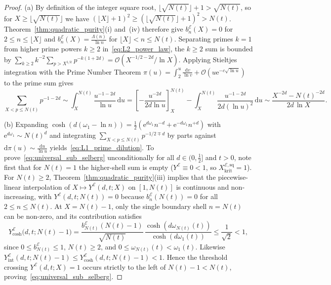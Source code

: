 \documentclass[11pt,reqno]{amsart}
\theoremstyle{definition}
\theoremstyle{remark}
\numberwithin{equation}{section}
\newcommand{\dd}{\mathrm{d}}
\newcommand{\ee}{\mathrm{e}}
\begin{document}
\begin{proof}
(a) By definition of the integer square root, $\lfloor\sqrt{N(t)}\rfloor + 1 > \sqrt{N(t)}$, so for $X \ge \lfloor\sqrt{N(t)}\rfloor$ we have $(\lfloor X\rfloor + 1)^2 \ge (\lfloor\sqrt{N(t)}\rfloor + 1)^2 > N(t)$. Theorem~\ref{thm:quadratic_purity}(i) and~(iv) therefore give $b_n^{\mathcal{E}}(X) = 0$ for $2 \le n \le \lfloor X\rfloor$ and $b_n^{\mathcal{E}}(X) = \frac{\Lambda(n)}{\ln n}$ for $\lfloor X\rfloor < n \le N(t)$. Separating primes $k = 1$ from higher prime powers $k \ge 2$ in~\eqref{eq:L2_power_law}, the $k \ge 2$ sum is bounded by $\sum_{k \ge 2} k^{-2}\sum_{p > X^{1/k}} p^{-k(1+2d)} = \mathcal{O}(X^{-1/2-2d}/\ln X)$. Applying Stieltjes integration with the Prime Number Theorem $\pi(u) = \int_2^u \frac{\dd v}{\ln v} + \mathcal{O}(u\ee^{-c\sqrt{\ln u}})$ to the prime sum gives
\[
\sum_{X < p \le N(t)} p^{-1-2d} \sim \int_X^{N(t)} \frac{u^{-1-2d}}{\ln u}\,\dd u = \left[-\frac{u^{-2d}}{2d\ln u}\right]_X^{N(t)} - \int_X^{N(t)} \frac{u^{-1-2d}}{2d(\ln u)^2}\,\dd u \sim \frac{X^{-2d} - N(t)^{-2d}}{2d\,\ln X}.
\]

(b) Expanding $\cosh(d(\omega_1 - \ln n)) = \frac{1}{2}(\ee^{d\omega_1}n^{-d} + \ee^{-d\omega_1}n^{+d})$ with $\ee^{d\omega_1} \sim N(t)^d$ and integrating $\sum_{X < p \le N(t)} p^{-1/2 \mp d}$ by parts against $\dd\pi(u) \sim \frac{\dd u}{\ln u}$ yields~\eqref{eq:L1_prime_dilution}. To prove~\eqref{eq:universal_sub_selberg} unconditionally for all $d \in (0, \frac{1}{2}]$ and $t > 0$, note first that for $N(t) = 1$ the higher-shell sum is empty ($Y^{\mathcal{E}} \equiv 0 < 1$, so $X_{\mathrm{krit}}^{\mathcal{E},\mathrm{sq}} = 1$). For $N(t) \ge 2$, Theorem~\ref{thm:quadratic_purity}(iii) implies that the piecewise-linear interpolation of $X \mapsto Y^{\mathcal{E}}(d,t;X)$ on $[1, N(t)]$ is continuous and non-increasing, with $Y^{\mathcal{E}}(d,t;N(t)) = 0$ because $b_n^{\mathcal{E}}(N(t)) = 0$ for all $2 \le n \le N(t)$. At $X = N(t) - 1$, only the single boundary shell $n = N(t)$ can be non-zero, and its contribution satisfies
\[
Y_{\cosh}^{\mathcal{E}}\bigl(d,t;N(t)-1\bigr) = \frac{b_{N(t)}^{\mathcal{E}}(N(t)-1)}{\sqrt{N(t)}}\,\frac{\cosh(d\omega_{N(t)}(t))}{\cosh(d\omega_1(t))} \le \frac{1}{\sqrt{2}} < 1,
\]
since $0 \le b_{N(t)}^{\mathcal{E}} \le 1$, $N(t) \ge 2$, and $0 \le \omega_{N(t)}(t) < \omega_1(t)$. Likewise $Y_{\mathrm{int}}^{\mathcal{E}}(d,t;N(t)-1) \le Y_{\cosh}^{\mathcal{E}}(d,t;N(t)-1) < 1$. Hence the threshold crossing $Y^{\mathcal{E}}(d,t;X) = 1$ occurs strictly to the left of $N(t) - 1 < N(t)$, proving~\eqref{eq:universal_sub_selberg}.
\end{proof}
\end{document}
